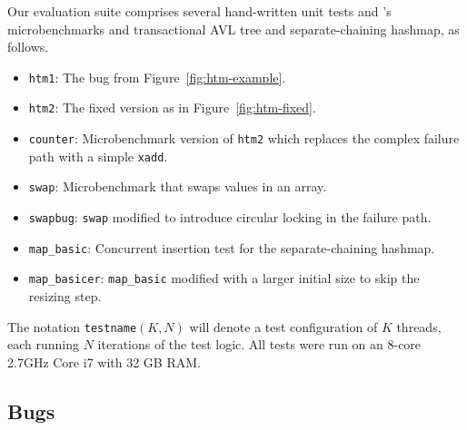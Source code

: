 \documentclass[10pt]{sigplanconf}
\begin{document}
Our evaluation suite comprises several hand-written unit tests
and \cite{htm-mario}'s microbenchmarks and transactional AVL tree and separate-chaining hashmap,
as follows.

\begin{itemize}
	\item {\tt htm1}: The bug from Figure~\ref{fig:htm-example}. %
	\item {\tt htm2}: The fixed version as in Figure~\ref{fig:htm-fixed}.
	\item {\tt counter}: Microbenchmark version of {\tt htm2} which replaces the complex failure path with a simple {\tt xadd}.
	\item {\tt swap}: Microbenchmark that swaps values in an array.
	\item {\tt swapbug}: {\tt swap} modified to introduce circular locking in the failure path. %
	\item {\tt map\_basic}: Concurrent insertion test for the separate-chaining hashmap.
	\item {\tt map\_basicer}: {\tt map\_basic} modified with a larger initial size to skip the resizing step.
\end{itemize}

The notation {\tt testname}$(K,N)$ will denote a test configuration of $K$ threads, each running $N$ iterations of the test logic.
All tests were run on an 8-core 2.7GHz Core i7 with 32 GB RAM.

\subsection{Bugs}
\end{document}

